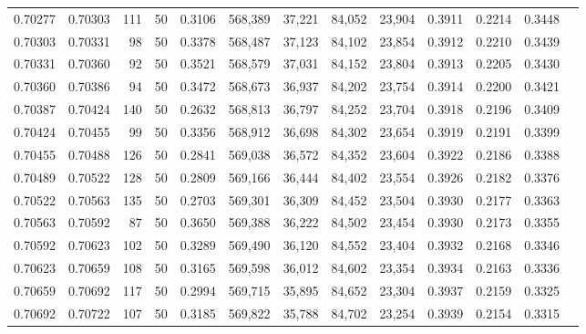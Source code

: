 \begin{tabular}{rrrrrrrrrrrrr}
0.70277 & 0.70303 &   111 &  50 &                                     0.3106 & 568,389 &  37,221 &  84,052 &  23,904 & 0.3911 & 0.2214 & 0.3448 \\
0.70303 & 0.70331 &    98 &  50 &                                     0.3378 & 568,487 &  37,123 &  84,102 &  23,854 & 0.3912 & 0.2210 & 0.3439 \\
0.70331 & 0.70360 &    92 &  50 &                                     0.3521 & 568,579 &  37,031 &  84,152 &  23,804 & 0.3913 & 0.2205 & 0.3430 \\
0.70360 & 0.70386 &    94 &  50 &                                     0.3472 & 568,673 &  36,937 &  84,202 &  23,754 & 0.3914 & 0.2200 & 0.3421 \\
0.70387 & 0.70424 &   140 &  50 &                                     0.2632 & 568,813 &  36,797 &  84,252 &  23,704 & 0.3918 & 0.2196 & 0.3409 \\
0.70424 & 0.70455 &    99 &  50 &                                     0.3356 & 568,912 &  36,698 &  84,302 &  23,654 & 0.3919 & 0.2191 & 0.3399 \\
0.70455 & 0.70488 &   126 &  50 &                                     0.2841 & 569,038 &  36,572 &  84,352 &  23,604 & 0.3922 & 0.2186 & 0.3388 \\
0.70489 & 0.70522 &   128 &  50 &                                     0.2809 & 569,166 &  36,444 &  84,402 &  23,554 & 0.3926 & 0.2182 & 0.3376 \\
0.70522 & 0.70563 &   135 &  50 &                                     0.2703 & 569,301 &  36,309 &  84,452 &  23,504 & 0.3930 & 0.2177 & 0.3363 \\
0.70563 & 0.70592 &    87 &  50 &                                     0.3650 & 569,388 &  36,222 &  84,502 &  23,454 & 0.3930 & 0.2173 & 0.3355 \\
0.70592 & 0.70623 &   102 &  50 &                                     0.3289 & 569,490 &  36,120 &  84,552 &  23,404 & 0.3932 & 0.2168 & 0.3346 \\
0.70623 & 0.70659 &   108 &  50 &                                     0.3165 & 569,598 &  36,012 &  84,602 &  23,354 & 0.3934 & 0.2163 & 0.3336 \\
0.70659 & 0.70692 &   117 &  50 &                                     0.2994 & 569,715 &  35,895 &  84,652 &  23,304 & 0.3937 & 0.2159 & 0.3325 \\
0.70692 & 0.70722 &   107 &  50 &                                     0.3185 & 569,822 &  35,788 &  84,702 &  23,254 & 0.3939 & 0.2154 & 0.3315 \\

\end{tabular}
